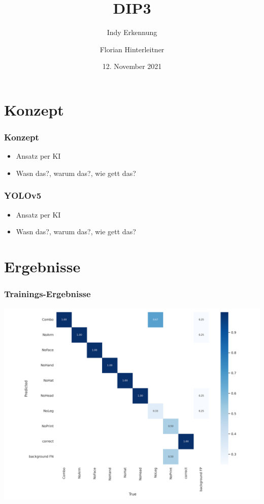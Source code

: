\documentclass[ignorenonframetext,naustrian,12pt,t]{beamer}
\author{Florian Hinterleitner}
\title{DIP3}
\subtitle{Indy Erkennung}
\date{12. November 2021}
\begin{document}
\begin{frame}
  \titlepage
\end{frame}


\section{Konzept}
	\begin{frame}
		\frametitle{Konzept}
		\begin{itemize}[label={\color{myTitleColour}\textbullet}]
		\item Ansatz per KI
		\item	Wasn das?, warum das?, wie gett das?
		\end{itemize}
	\end{frame}
	
	\begin{frame}
		\frametitle{YOLOv5}
		\begin{itemize}[label={\color{myTitleColour}\textbullet}]
		\item Ansatz per KI
		\item	Wasn das?, warum das?, wie gett das?
		\end{itemize}
	\end{frame}
	


\section{Ergebnisse}
\begin{frame}
	\frametitle{Trainings-Ergebnisse}
		\centering
		\includegraphics[height=.9\textheight]{../sModel/confusion_matrixV3.png}
\end{frame}
\end{document}

